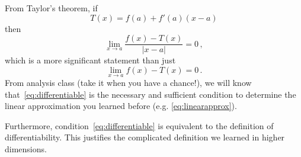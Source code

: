 \documentclass[aspectratio=169]{beamer}
\begin{document}
\begin{frame}
    From Taylor's theorem,
    if 
    \begin{equation}
        T(x) = f(a) + f'(a) (x-a) \label{eq:linearapprox}
    \end{equation}
    then \pause
    \begin{equation}
        \lim_{x\to a} \frac{f(x) - T(x)}{|x-a|} = 0 \,, \label{eq:differentiable}
    \end{equation}
    which is a more significant statement than just
    \begin{equation*}
        \lim_{x\to a} f(x) - T(x) = 0 \,.
    \end{equation*}
    \pause
    From analysis class (take it when you have a chance!), 
   we will know that~\eqref{eq:differentiable} is the
    necessary and sufficient condition to 
    determine the linear approximation you learned before (e.g. \eqref{eq:linearapprox}).

    \pause
    Furthermore, condition~\eqref{eq:differentiable} is equivalent to the definition
    of differentiability.
    This justifies the complicated definition we learned in higher dimensions.
\end{frame}
\end{document}
